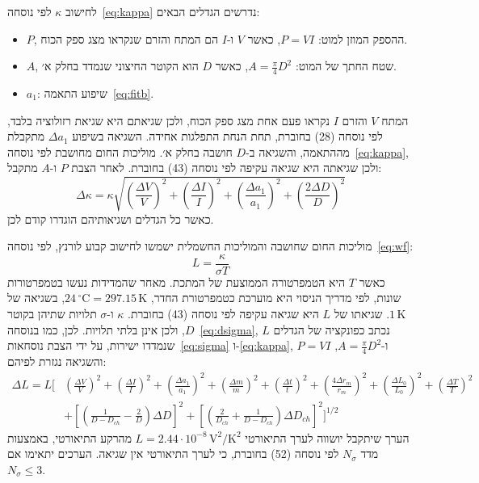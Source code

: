 \documentclass[10pt,a4paper]{article}
\newcommand{\U}[1]{\,\mathrm{#1}}
\begin{document}
לחישוב $\kappa$ לפי נוסחה~\eqref{eq:kappa} נדרשים הגדלים הבאים:
\begin{itemize}\setlength{\itemsep}{0pt}\setlength{\parskip}{0pt}
  \item $P$, ההספק המוזן למוט: $P = VI$, כאשר $V$ ו-$I$ הם המתח והזרם שנקראו מצג ספק הכוח.
  \item $A$, שטח החתך של המוט: $A = \frac{\pi}{4}D^2$, כאשר $D$ הוא הקוטר החיצוני שנמדד בחלק א׳.
  \item $a_1$: שיפוע התאמה~\eqref{eq:fitb}.
\end{itemize}

המתח $V$ והזרם $I$ נקראו פעם אחת מצג ספק הכוח, ולכן שגיאתם היא שגיאת רזולוציה בלבד, לפי נוסחה (28) בחוברת, תחת הנחת התפלגות אחידה. השגיאה בשיפוע $\Delta a_1$ מתקבלת מההתאמה, והשגיאה ב-$D$ חושבה בחלק א׳. מוליכות החום מחושבת לפי נוסחה~\eqref{eq:kappa}, ולכן שגיאתה היא שגיאה עקיפה לפי נוסחה (43) בחוברת. לאחר הצבת $P$ ו-$A$ מתקבל:
\begin{equation}\label{eq:dkappa}
\Delta\kappa = \kappa\sqrt{\left(\frac{\Delta V}{V}\right)^2 + \left(\frac{\Delta I}{I}\right)^2 + \left(\frac{\Delta a_1}{a_1}\right)^2 + \left(\frac{2\Delta D}{D}\right)^2}
\end{equation}
כאשר כל הגדלים ושגיאותיהם הוגדרו קודם לכן.


מוליכות החום שחושבה והמוליכות החשמלית ישמשו לחישוב קבוע לורנץ, לפי נוסחה~\eqref{eq:wf}:
\begin{equation}\label{eq:lorenz}
L = \frac{\kappa}{\sigma T}
\end{equation}
כאשר $T$ היא הטמפרטורה הממוצעת של המתכת. מאחר שהמדידות נעשו בטמפרטורות שונות, לפי מדריך הניסוי היא מוערכת כטמפרטורת החדר, $24\U{^\circ C} = 297.15\U{K}$, בשגיאה של $1\U{K}$. שגיאתו של $L$ היא שגיאה עקיפה לפי נוסחה (43) בחוברת. $\kappa$ ו-$\sigma$ תלויות שתיהן בקוטר $D$, ולכן אינן בלתי תלויות. לכן, כמו בנוסחה~\eqref{eq:dsigma}, $L$ נכתב כפונקציה של הגדלים שנמדדו ישירות, על ידי הצבת נוסחאות~\eqref{eq:sigma} ו-\eqref{eq:kappa}, $P = VI$ ו-$A = \frac{\pi}{4}D^2$, והשגיאה נגזרת לפיהם:
\begin{equation}\label{eq:dlorenz}
\begin{split}
\Delta L = L\Bigg[&\left(\frac{\Delta V}{V}\right)^2 + \left(\frac{\Delta I}{I}\right)^2 + \left(\frac{\Delta a_1}{a_1}\right)^2 + \left(\frac{\Delta m}{m}\right)^2 + \left(\frac{\Delta t}{t}\right)^2 + \left(\frac{4\Delta r_m}{r_m}\right)^2 + \left(\frac{\Delta L_0}{L_0}\right)^2 + \left(\frac{\Delta T}{T}\right)^2 \\
&+ \left[\left(\frac{1}{D - D_{ch}} - \frac{2}{D}\right)\Delta D\right]^2 + \left[\left(\frac{2}{D_{ch}} + \frac{1}{D - D_{ch}}\right)\Delta D_{ch}\right]^2\Bigg]^{1/2}
\end{split}
\end{equation}
הערך שיתקבל יושווה לערך התיאורטי $L = 2.44 \cdot 10^{-8}\U{V^2/K^2}$ מהרקע התיאורטי, באמצעות מדד $N_\sigma$ לפי נוסחה (52) בחוברת, כי לערך התיאורטי אין שגיאה. הערכים יתאימו אם $N_\sigma \le 3$.
\end{document}
